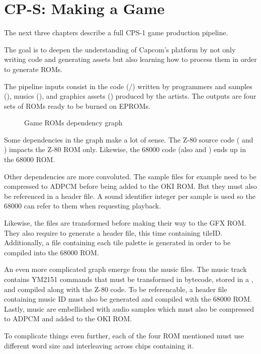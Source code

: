 \chapter{CP-S: Making a Game}

The next three chapters describe a full CPS-1 game production pipeline. 

The goal is to deepen the understanding of Capcom's platform by not only writing code and generating assets but also learning how to process them in order to generate ROMs.

The pipeline inputs consist in the code (/) written by programmers and samples (), musics (), and graphics assets () produced by the artists. The outputs are four sets of ROMs ready to be burned on EPROMs. 

 \begin{figure}[H]
\caption*{Game ROMs dependency graph}
\end{figure}

Some dependencies in the graph make a lot of sense. The Z-80 source code ( and ) impacts the Z-80 ROM only. Likewise, the 68000 code (also  and ) ends up in the 68000 ROM.

Other dependencies are more convoluted. The  sample files for example need to be compressed to ADPCM before being added to the OKI ROM. But they must also be referenced in a  header file. A sound identifier integer per sample is used so the 68000 can refer to them when requesting playback.

Likewise, the  files are transformed before making their way to the GFX ROM. They also require to generate a  header file, this time containing tileID. Additionally, a  file containing each tile palette is generated in order to be compiled into the 68000 ROM. 

An even more complicated graph emerge from the music  files. The music track contains YM2151 commands that must be transformed in bytecode, stored in a , and compiled along with the Z-80 code. To be referencable, a header file containing music ID must also be generated and compiled with the 68000 ROM. Lastly, music are embellished with audio samples which must also be compressed to ADPCM and added to the OKI ROM.

To complicate things even further, each of the four ROM mentioned must use different word size and interleaving across chips containing it.

